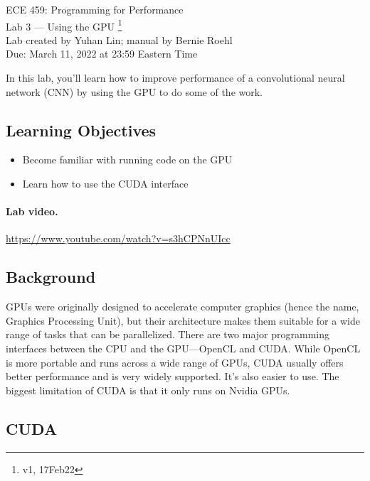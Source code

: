 



\begin{center}
{\Large ECE 459: Programming for Performance}\\
{\Large Lab 3 --- Using the GPU \footnote{v1, 17Feb22}}\\[1em]
Lab created by Yuhan Lin; manual by Bernie Roehl\\
Due: March 11, 2022 at 23:59 Eastern Time
\end{center}

In this lab, you'll learn how to improve performance of a convolutional neural network (CNN) by using the GPU to do some of the work.


\subsection*{Learning Objectives}

\begin{itemize}[noitemsep]
	\item Become familiar with running code on the GPU

	\item Learn how to use the CUDA interface
\end{itemize}

\paragraph{Lab video.} \url{https://www.youtube.com/watch?v=s3hCPNnUIcc}

\subsection*{Background}

GPUs were originally designed to accelerate computer graphics (hence the name, Graphics Processing Unit), but their architecture makes them suitable for a wide range of tasks that can be parallelized. There are two major programming interfaces between the CPU and the GPU---OpenCL and CUDA. While OpenCL is more portable and runs across a wide range of GPUs, CUDA usually offers better performance and is very widely supported. It's also easier to use. The biggest limitation of CUDA is that it only runs on Nvidia GPUs.

\subsection*{CUDA}

